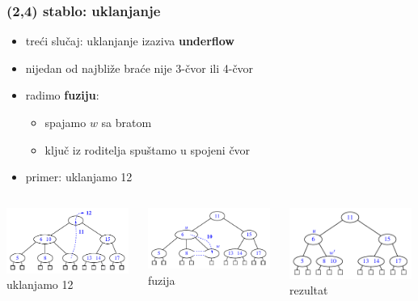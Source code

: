 \documentclass[compress]{beamer}
\begin{document}
\begin{frame}[fragile]
  \frametitle{(2,4) stablo: uklanjanje}
  \begin{itemize}
    \item treći slučaj: uklanjanje izaziva \textbf{underflow}
    \item nijedan od najbliže braće nije 3-čvor ili 4-čvor
    \item radimo \textbf{fuziju}:
    \begin{itemize}
      \item spajamo $w$ sa bratom
      \item ključ iz roditelja spuštamo u spojeni čvor 
    \end{itemize}
    \item primer: uklanjamo 12
  \end{itemize}
  \begin{columns}
    \begin{column}[c]{4cm}
      \begin{center}
        \includegraphics[width=4cm]{asp-11-pic36a.pdf}
      \\ uklanjamo 12
      \end{center}
    \end{column}
    \begin{column}[c]{4cm}
      \begin{center}
        \includegraphics[width=4cm]{asp-11-pic36b.pdf}
      \\ fuzija
      \end{center}
    \end{column}
    \begin{column}[c]{4cm}
      \begin{center}
        \includegraphics[width=4cm]{asp-11-pic36c.pdf}
      \\ rezultat
      \end{center}
    \end{column}
  \end{columns}
\end{frame}
\end{document}
